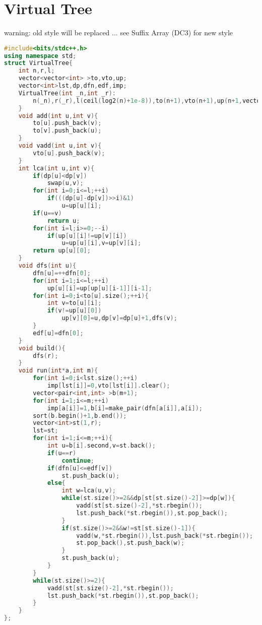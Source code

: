 \documentclass{book}
\begin{document}
\section{Virtual Tree}
warning: old style will be replaced ... see Suffix Array (DC3) for new style\begin{lstlisting}[language=C++,title={Virtual Tree.hpp (2375 bytes, 77 lines)}]
#include<bits/stdc++.h>
using namespace std;
struct VirtualTree{
    int n,r,l;
    vector<vector<int> >to,vto,up;
    vector<int>lst,dp,dfn,edf,imp;
    VirtualTree(int _n,int _r):
        n(_n),r(_r),l(ceil(log2(n)+1e-8)),to(n+1),vto(n+1),up(n+1,vector<int>(l+1)),dp(n+1),dfn(n+1),edf(n+1),imp(n+1){
    }
    void add(int u,int v){
        to[u].push_back(v);
        to[v].push_back(u);
    }
    void vadd(int u,int v){
        vto[u].push_back(v);
    }
    int lca(int u,int v){
        if(dp[u]<dp[v])
            swap(u,v);
        for(int i=0;i<=l;++i)
            if(((dp[u]-dp[v])>>i)&1)
                u=up[u][i];
        if(u==v)
            return u;
        for(int i=l;i>=0;--i)
            if(up[u][i]!=up[v][i])
                u=up[u][i],v=up[v][i];
        return up[u][0];
    }
    void dfs(int u){
        dfn[u]=++dfn[0];
        for(int i=1;i<=l;++i)
            up[u][i]=up[up[u][i-1]][i-1];
        for(int i=0;i<to[u].size();++i){
            int v=to[u][i];
            if(v!=up[u][0])
                up[v][0]=u,dp[v]=dp[u]+1,dfs(v);
        }
        edf[u]=dfn[0];
    }
    void build(){
        dfs(r);
    }
    void run(int*a,int m){
        for(int i=0;i<lst.size();++i)
            imp[lst[i]]=0,vto[lst[i]].clear();
        vector<pair<int,int> >b(m+1);
        for(int i=1;i<=m;++i)
            imp[a[i]]=1,b[i]=make_pair(dfn[a[i]],a[i]);
        sort(b.begin()+1,b.end());
        vector<int>st(1,r);
        lst=st;
        for(int i=1;i<=m;++i){
            int u=b[i].second,v=st.back();
            if(u==r)
                continue;
            if(dfn[u]<=edf[v])
                st.push_back(u);
            else{
                int w=lca(u,v);
                while(st.size()>=2&&dp[st[st.size()-2]]>=dp[w]){
                    vadd(st[st.size()-2],*st.rbegin());
                    lst.push_back(*st.rbegin()),st.pop_back();
                }
                if(st.size()>=2&&w!=st[st.size()-1]){
                    vadd(w,*st.rbegin()),lst.push_back(*st.rbegin());
                    st.pop_back(),st.push_back(w);
                }
                st.push_back(u);
            }
        }
        while(st.size()>=2){
            vadd(st[st.size()-2],*st.rbegin());
            lst.push_back(*st.rbegin()),st.pop_back();
        }
    }
};
\end{lstlisting}
\end{document}
